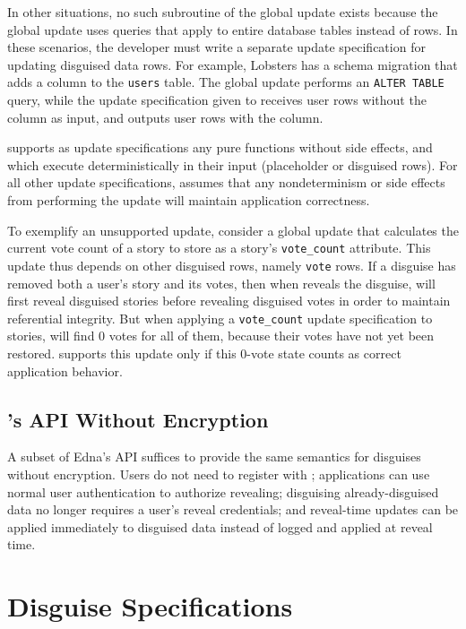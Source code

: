 %
    In other situations, no such subroutine of the global update exists because
    the global update uses queries that apply to entire database tables instead
    of rows.  In these scenarios, the developer must write a separate update
    specification for updating disguised data rows.
%
    For example, Lobsters has a schema migration that adds a column to the
    \texttt{users} table.  The global update performs an \texttt{ALTER TABLE}
    query, while the update specification given to \sys receives user rows
    without the column as input, and outputs user rows with the column.
%

\sys supports as update specifications any pure functions without side effects,
and which execute deterministically in their input (placeholder or disguised
rows).
%
For all other update specifications, \sys assumes that any nondeterminism or side effects from performing the
    update will maintain application correctness.

%
    To exemplify an unsupported update, consider a global update that calculates the
    current vote count of a story to store as a story's \texttt{vote\_count}
    attribute. 
%
    This update thus depends on other disguised rows, namely \texttt{vote} rows.
%
    If a disguise has removed both a user's story and its votes, then when \sys
    reveals the disguise, \sys will first reveal disguised stories before
    revealing disguised votes in order to maintain referential integrity. 
%
    But when applying a \texttt{vote\_count} update specification to stories,
    \sys will find 0 votes for all of them, because their votes have not yet
    been restored.
%
    \sys supports this update only if this 0-vote state counts as correct
    application behavior.
%

    
\subsection{\sys's API Without Encryption}
\label{s:noencrypt-api}
A subset of Edna's API suffices to provide the same semantics for disguises
without encryption. Users do not need to register with \sys; applications can
use normal user authentication to authorize revealing; disguising
already-disguised data no longer requires a user's reveal credentials; and
reveal-time updates can be applied immediately to disguised data instead of
logged and applied at reveal time.


\section{Disguise Specifications}
\label{s:semantics:spec}

